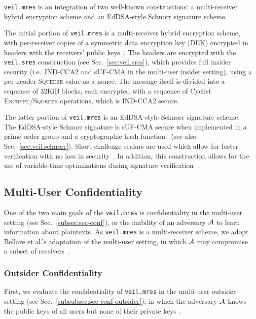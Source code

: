 \texttt{veil.mres} is an integration of two well-known constructions: a multi-receiver hybrid
encryption scheme and an EdDSA-style Schnorr signature scheme.

The initial portion of \texttt{veil.mres} is a multi-receiver hybrid encryption scheme, with
per-receiver copies of a symmetric data encryption key \@(DEK) encrypted in headers with the
receivers' public keys~\cite{kurosawa2002, bellare2003, bellare2007, rfc4880}\@. The headers are
encrypted with the \texttt{veil.sres} construction (see Sec.~\ref{sec:veil.sres}), which provides
full insider security (i.e.\ IND-CCA2 and sUF-CMA in the multi-user insider setting), using a
per-header \textsc{Squeeze} value as a nonce. The message itself is divided into a sequence of 32KiB
blocks, each encrypted with a sequence of Cyclist \textsc{Encrypt}\@/\textsc{Squeeze} operations,
which is IND-CCA2 secure.

The latter portion of \texttt{veil.mres} is an EdDSA-style Schnorr signature scheme. The EdDSA-style
Schnorr signature is sUF-CMA secure when implemented in a prime order group and a cryptographic hash
function~\cite{brendel2021, chalkias2020, pointcheval2000, neven2009} \@(see also
Sec.~\ref{sec:veil.schnorr})\@. Short challenge scalars are used which allow for faster verification
with no loss in security~\cite{pornin2022}. In addition, this construction allows for the use of
variable-time optimizations during signature verification~\cite{pornin2020schnorr}.

\subsection{Multi-User Confidentiality}\label{subsec:veil.mres-conf}

One of the two main goals of the \texttt{veil.mres} is confidentiality in the multi-user setting
(see Sec.~\ref{subsec:sec-conf}), or the inability of an adversary $\mathcal{A}$ to learn information
about plaintexts. As \texttt{veil.mres} is a multi-receiver scheme, we adopt Bellare et al.'s
adaptation of the multi-user setting, in which $\mathcal{A}$ may compromise a subset of
receivers~\cite{bellare2007}\@.

\subsubsection{Outsider Confidentiality}

First, we evaluate the confidentiality of \texttt{veil.mres} in the multi-user outsider setting (see
Sec.~\ref{subsubsec:sec-conf-outsider}), in which the adversary $\mathcal{A}$ knows the public keys
of all users but none of their private keys~\cite[p. 44]{baek2010}\@.


